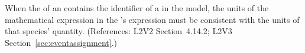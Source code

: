 When the   of an \EventAssignment
contains the identifier of a \Species in the model, the
units of the mathematical expression in the
\EventAssignment's  expression must be
consistent with the units of that species' quantity.
(References: L2V2 Section~4.14.2; L2V3 Section~\ref{sec:eventassignment}.)
